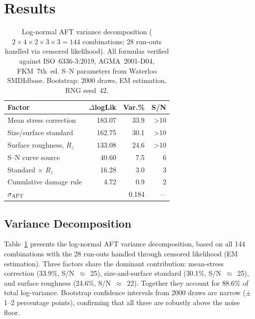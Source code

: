 \documentclass[12pt,a4paper]{article}
\begin{document}
\section{Results}
\label{sec:results}

\begin{table}[h]
\centering
\caption{Log-normal AFT variance decomposition ($2\times4\times2\times3\times3 =
144$ combinations; 28 run-outs handled via censored likelihood).%
All formulas verified against ISO~6336-3:2019, AGMA~2001-D04, FKM~7th~ed.
S--N parameters from Waterloo SMDIdbase. Bootstrap: 2000 draws, EM estimation, RNG seed~42.}
\label{tab:anova}
\begin{tabular}{lrrr}
\toprule
Factor & $\Delta$logLik & Var.\% & S/N \\
\midrule
Mean stress correction      & 183.07 & 33.9 & >10 \\
Size/surface standard       & 162.75 & 30.1 & >10 \\
Surface roughness, $R_z$    & 133.08 & 24.6 & >10 \\
S--N curve source           &  40.60 &  7.5 &  ~6 \\
Standard $\times$ $R_z$     &  16.28 &  3.0 &  ~3 \\
Cumulative damage rule      &   4.72 &  0.9 &  ~2 \\
\midrule
$\sigma_{\rm AFT}$          &        & 0.184 & --- \\
\bottomrule
\end{tabular}
\end{table}

\subsection{Variance Decomposition}

Table~\ref{tab:anova} presents the log-normal AFT variance
decomposition, based on all 144 combinations with the 28 run-outs
handled through censored likelihood (EM estimation). Three factors share the
dominant contribution: mean-stress correction (33.9\%, S/N~$\approx$~25),
size-and-surface standard (30.1\%, S/N~$\approx$~25), and surface roughness
(24.6\%, S/N~$\approx$~22). Together they account for 88.6\% of total
log-variance. Bootstrap confidence intervals from 2000 draws are narrow
($\pm$1--2 percentage points), confirming that all three are robustly
above the noise floor.
\end{document}
